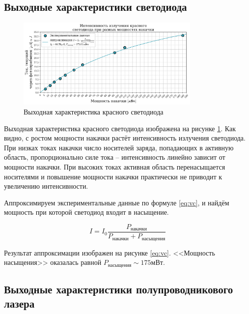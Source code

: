 \documentclass[a4paper, 12pt]{extarticle}
\begin{document}
\subsection*{\textcolor{sub_header}{Выходные характеристики светодиода}}

\begin{figure}[htbp]
    \centering
    \includegraphics[width = 0.8\textwidth]{red_vc.png}
    \caption{Выходная характеристика красного светодиода}
    \label{fig:red_vc}
\end{figure}

Выходная характеристика красного светодиода изображена на рисунке \ref{fig:red_vc}. 
Как видно, с ростом мощности накачки растёт интенсивность излучения светодиода. При низках токах накачки число носителей заряда, попадающих в активную область, пропорционально силе тока --  интенсивность линейно зависит от мощности накачки. При высоких токах активная область перенасыщается носителями и повышение мощности накачки практически не приводит к увеличению интенсивности.


Аппроксимируем экспериментальные данные по формуле \ref{eq:vc}, и найдём мощность при которой светодиод входит в насыщение.

\begin{equation}
    I = I_0 \frac{P_{\text{накачки}}}{P_{\text{накачки}} + P_{\text{насыщения}}}
    \label{eq:vc}
\end{equation}

Результат аппроксимации изображен на рисунке  \ref{eq:vc}. <<Мощность насыщения>> оказалась равной $P_{\text{насыщения}} \sim 175 \text{мВт}$.



\subsection*{\textcolor{sub_header}{Выходные характеристики полупроводникового лазера}}
\end{document}
